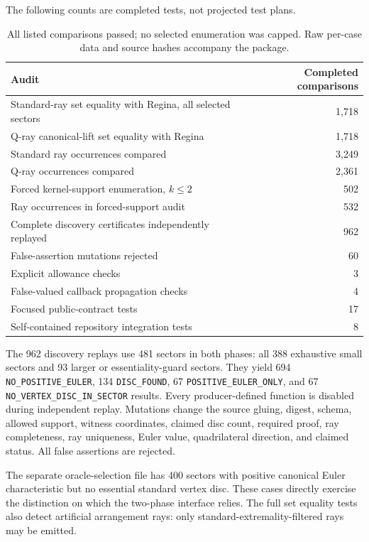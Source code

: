 \documentclass[11pt]{article}
\theoremstyle{definition}
\theoremstyle{remark}
\newcommand{\code}[1]{\texttt{#1}}
\begin{document}
The following counts are completed tests, not projected test plans.
\begin{table}[ht]
\centering\small
\begin{tabularx}{\textwidth}{@{}Xr@{}}
\toprule
Audit & Completed comparisons \\
\midrule
Standard-ray set equality with Regina, all selected sectors & 1,718 \\
Q-ray canonical-lift set equality with Regina & 1,718 \\
Standard ray occurrences compared & 3,249 \\
Q-ray occurrences compared & 2,361 \\
Forced kernel-support enumeration, $k\le2$ & 502 \\
Ray occurrences in forced-support audit & 532 \\
Complete discovery certificates independently replayed & 962 \\
False-assertion mutations rejected & 60 \\
Explicit allowance checks & 3 \\
False-valued callback propagation checks & 4 \\
Focused public-contract tests & 17 \\
Self-contained repository integration tests & 8 \\
\bottomrule
\end{tabularx}
\caption{All listed comparisons passed; no selected enumeration was capped.
Raw per-case data and source hashes accompany the package.}
\label{tab:audit}
\end{table}

The 962 discovery replays use 481 sectors in both phases: all 388 exhaustive
small sectors and 93 larger or essentiality-guard sectors. They yield 694
\code{NO\_POSITIVE\_EULER}, 134 \code{DISC\_FOUND}, 67
\code{POSITIVE\_EULER\_ONLY}, and 67
\code{NO\_VERTEX\_DISC\_IN\_SECTOR} results. Every producer-defined function
is disabled during independent replay. Mutations change the source gluing,
digest, schema, allowed support, witness coordinates, claimed disc count,
required proof, ray completeness, ray uniqueness, Euler value, quadrilateral
direction, and claimed status. All false assertions are rejected.

The separate oracle-selection file has 400 sectors with positive canonical
Euler characteristic but no essential standard vertex disc. These cases
directly exercise the distinction on which the two-phase interface relies.
The full set equality tests also detect artificial arrangement rays: only
standard-extremality-filtered rays may be emitted.
\end{document}
